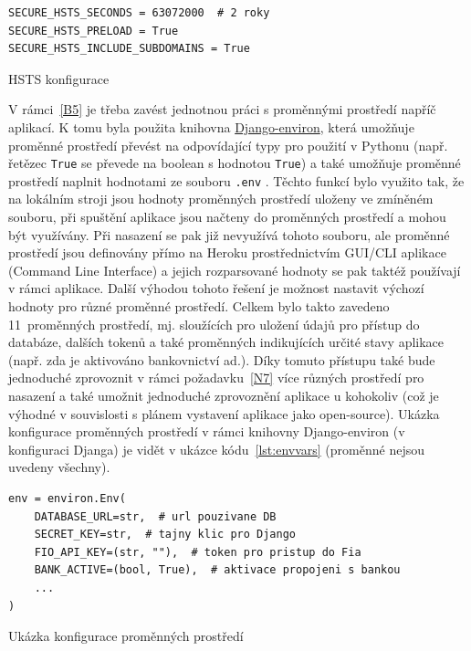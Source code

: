 \begin{listing}[ht]
	\begin{verbatim}
SECURE_HSTS_SECONDS = 63072000  # 2 roky
SECURE_HSTS_PRELOAD = True
SECURE_HSTS_INCLUDE_SUBDOMAINS = True
	\end{verbatim}
	\caption{HSTS konfigurace}\label{lst:hsts}
\end{listing}

V rámci~\ref{B5} je třeba zavést jednotnou práci s proměnnými prostředí napříč aplikací. K tomu byla použita knihovna \href{https://django-environ.readthedocs.io/en/latest/}{Django-environ}, která umožňuje proměnné prostředí převést na odpovídající typy pro použití v Pythonu (např. řetězec \verb|True| se převede na boolean s hodnotou \verb|True|) a také umožňuje proměnné prostředí naplnit hodnotami ze souboru \verb|.env| \cite{django-environ}. Těchto funkcí bylo využito tak, že na lokálním stroji jsou hodnoty proměnných prostředí uloženy ve zmíněném souboru, při spuštění aplikace jsou načteny do proměnných prostředí a mohou být využívány. Při nasazení se pak již nevyužívá tohoto souboru, ale proměnné prostředí jsou definovány přímo na Heroku prostřednictvím GUI/CLI aplikace (Command Line Interface) a jejich rozparsované hodnoty se pak taktéž používají v rámci aplikace. Další výhodou tohoto řešení je možnost nastavit výchozí hodnoty pro různé proměnné prostředí. Celkem bylo takto zavedeno 11~proměnných prostředí, mj. sloužících pro uložení údajů pro přístup do databáze, dalších tokenů a také proměnných indikujících určité stavy aplikace (např. zda je aktivováno bankovnictví ad.). Díky tomuto přístupu také bude jednoduché zprovoznit v rámci požadavku~\ref{N7} více různých prostředí pro nasazení a také umožnit jednoduché zprovoznění aplikace u kohokoliv (což je výhodné v souvislosti s plánem vystavení aplikace jako open-source). Ukázka konfigurace proměnných prostředí v rámci knihovny Django-environ (v konfiguraci Djanga) je vidět v ukázce kódu~\ref{lst:envvars} (proměnné nejsou uvedeny všechny).

\begin{listing}[ht]
	\begin{verbatim}
env = environ.Env(
    DATABASE_URL=str,  # url pouzivane DB
    SECRET_KEY=str,  # tajny klic pro Django
    FIO_API_KEY=(str, ""),  # token pro pristup do Fia
    BANK_ACTIVE=(bool, True),  # aktivace propojeni s bankou
    ...
)
	\end{verbatim}
	\caption{Ukázka konfigurace proměnných prostředí}\label{lst:envvars}
\end{listing}

